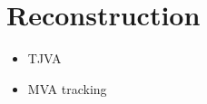 \chapter{Reconstruction}
\label{sec:reconstruction}

\begin{itemize}
\item TJVA
\item MVA tracking
\end{itemize}
